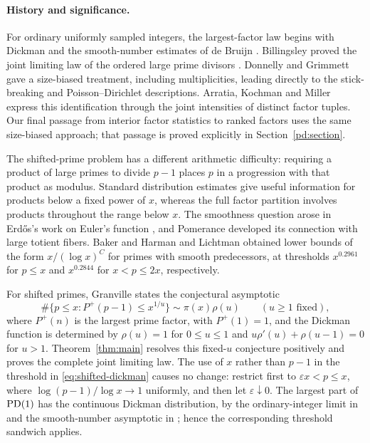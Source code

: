 \paragraph{History and significance.}
For ordinary uniformly sampled integers, the largest-factor law begins
with Dickman \cite{Dickman} and the smooth-number estimates of
de Bruijn \cite{deBruijn1951}. Billingsley proved the joint limiting
law of the ordered large prime divisors \cite{Billingsley}.
Donnelly and Grimmett \cite[Theorem~1 and Corollaries~2--3]{DonnellyGrimmett}
gave a size-biased treatment, including multiplicities, leading directly
to the stick-breaking and Poisson--Dirichlet descriptions. Arratia,
Kochman and Miller \cite{ArratiaKochmanMiller2014} express this
identification through the joint intensities of distinct factor
tuples. Our final passage from interior factor statistics to ranked
factors uses the same size-biased approach; that passage is proved
explicitly in Section~\ref{pd:section}.

The shifted-prime problem has a different arithmetic difficulty:
requiring a product of large primes to divide $p-1$ places $p$ in
a progression with that product as modulus. Standard distribution
estimates give useful information for products below a fixed power
of $x$, whereas the full factor partition involves products throughout
the range below $x$. The smoothness question arose in Erd\H{o}s's
work on Euler's function \cite{Erdos1935,Erdos1956}, and
Pomerance \cite{Pomerance1980} developed its connection with large
totient fibers. Baker and Harman \cite[Theorem~1]{BakerHarman1998}
and Lichtman \cite[Theorem~1.1]{Lichtman2022} obtained lower bounds
of the form $x/(\log x)^C$ for primes with smooth predecessors, at
thresholds $x^{0.2961}$ for $p\le x$ and $x^{0.2844}$ for
$x<p\le2x$, respectively.

For shifted primes, Granville states the conjectural asymptotic
\cite[Section~5.3, Equation~(5.1)]{Granville}
\begin{equation}\label{eq:shifted-dickman}
 \#\{p\le x:P^+(p-1)\le x^{1/u}\}
       \sim\pi(x)\rho(u)\qquad(u\ge1\text{ fixed}),
\end{equation}
where $P^+(n)$ is the largest prime factor, with $P^+(1)=1$, and the Dickman function
is determined by $\rho(u)=1$ for $0\le u\le1$ and
$u\rho'(u)+\rho(u-1)=0$ for $u>1$.
Theorem~\ref{thm:main} resolves this fixed-$u$ conjecture
positively and proves the complete joint limiting law.  The use of
$x$ rather than $p-1$ in the threshold in
\eqref{eq:shifted-dickman} causes no change: restrict first to
$\varepsilon x<p\le x$, where
$\log(p-1)/\log x\to1$ uniformly, and then let
$\varepsilon\downarrow0$.  The largest part of $\operatorname{PD}(1)$ has the
continuous Dickman distribution, by the ordinary-integer limit in
\cite[Section~1]{DonnellyGrimmett} and the smooth-number asymptotic
in \cite[Section~1, Equation~(1.1)]{Granville}; hence the
corresponding threshold sandwich applies.


